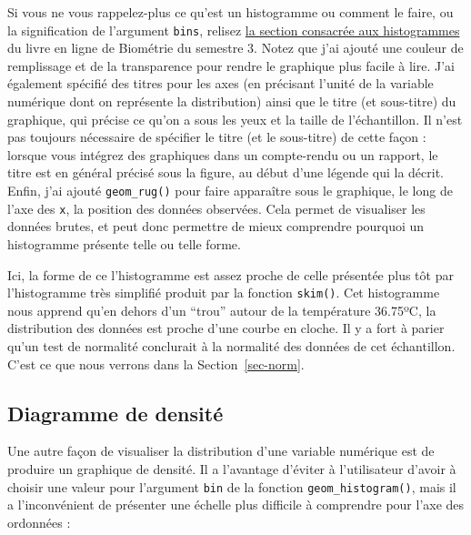 \documentclass[
  french,
  a4paper,
  DIV=11,
  numbers=noendperiod,
  oneside]{scrreprt}
\begin{document}
Si vous ne vous rappelez-plus ce qu'est un histogramme ou comment le
faire, ou la signification de l'argument \texttt{bins}, relisez
\href{https://besibo.github.io/DA/viz.html\#histogram}{la section
consacrée aux histogrammes} du livre en ligne de Biométrie du semestre
3. Notez que j'ai ajouté une couleur de remplissage et de la
transparence pour rendre le graphique plus facile à lire. J'ai également
spécifié des titres pour les axes (en précisant l'unité de la variable
numérique dont on représente la distribution) ainsi que le titre (et
sous-titre) du graphique, qui précise ce qu'on a sous les yeux et la
taille de l'échantillon. Il n'est pas toujours nécessaire de spécifier
le titre (et le sous-titre) de cette façon : lorsque vous intégrez des
graphiques dans un compte-rendu ou un rapport, le titre est en général
précisé sous la figure, au début d'une légende qui la décrit. Enfin,
j'ai ajouté \texttt{geom\_rug()} pour faire apparaître sous le
graphique, le long de l'axe des \texttt{x}, la position des données
observées. Cela permet de visualiser les données brutes, et peut donc
permettre de mieux comprendre pourquoi un histogramme présente telle ou
telle forme.

Ici, la forme de ce l'histogramme est assez proche de celle présentée
plus tôt par l'histogramme très simplifié produit par la fonction
\texttt{skim()}. Cet histogramme nous apprend qu'en dehors d'un ``trou''
autour de la température 36.75ºC, la distribution des données est proche
d'une courbe en cloche. Il y a fort à parier qu'un test de normalité
conclurait à la normalité des données de cet échantillon. C'est ce que
nous verrons dans la Section~\ref{sec-norm}.

\subsection{Diagramme de densité}\label{diagramme-de-densituxe9}

Une autre façon de visualiser la distribution d'une variable numérique
est de produire un graphique de densité. Il a l'avantage d'éviter à
l'utilisateur d'avoir à choisir une valeur pour l'argument \texttt{bin}
de la fonction \texttt{geom\_histogram()}, mais il a l'inconvénient de
présenter une échelle plus difficile à comprendre pour l'axe des
ordonnées :
\end{document}
